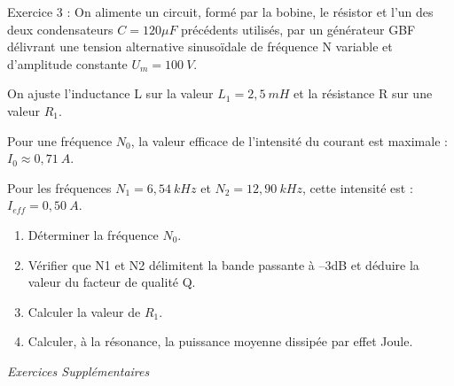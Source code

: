 \documentclass[12pt, french]{article}
\begin{document}
\begin{Box2}{Exercice 3 :  }
On alimente un circuit, formé par la bobine, le résistor et l'un des deux condensateurs $C=120\mu F$ précédents utilisés, par un générateur GBF délivrant une tension alternative sinusoïdale de fréquence N variable et d'amplitude constante $U_m = 100~V$.


On ajuste l'inductance L sur la valeur $L_1 = 2,5~mH$ et la résistance R sur une valeur $R_1$.

Pour une fréquence $N_0$, la valeur efficace de l'intensité du courant est maximale : $I_0 \approx 0,71~A$.

Pour les fréquences $N_1 = 6,54~kHz$ et $N_2 = 12,90~kHz$, cette intensité est : $I_{eff} = 0,50~A$.

\begin{enumerate}
  \item Déterminer la fréquence $N_0$. 
  \item Vérifier que N1 et N2 délimitent la bande passante à –3dB et déduire la valeur du facteur de qualité Q.
  \item Calculer la valeur de $R_1$.
  \item Calculer, à la résonance, la puissance moyenne dissipée par effet Joule.
\end{enumerate}
\end{Box2}




\begin{center}

\vspace{-0.7cm}
   \Large{ \em{Exercices Supplémentaires}}
\end{center}

\vspace{-0.7cm}
\end{document}
